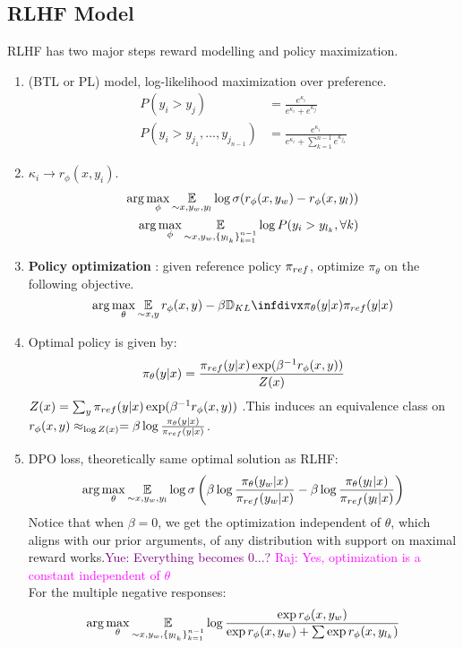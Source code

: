 \documentclass{article}
\newcommand{\yue}[1]{\textcolor{purple}{Yue: #1}}
\newcommand{\raj}[1]{\textcolor{magenta}{Raj: #1}}
\begin{document}
\subsection{RLHF Model}
RLHF has two major steps reward modelling and policy maximization.
\begin{enumerate}
    \item (BTL or PL) model, log-likelihood maximization over preference.
    \begin{align}
        P(y_i>y_j)&=\frac{e^{\kappa_i}}{e^{\kappa_i}+e^{\kappa_j}}\\
        P(y_i>y_{j_1},\dots,y_{j_{n-1}})&=\frac{e^{\kappa_i}}{e^{\kappa_i}+\sum_{k=1}^{n-1}e^{\kappa_{j_k}}}
    \end{align}
    \item $\kappa_i\to r_\phi(x,y_i)$.
    \begin{align}
    \arg\max\limits_{\phi}\operatorname*{\mathbb{E}}\limits_{\sim x, y_w, y_l}\log\sigma(r_\phi(x,y_w)-r_\phi(x,y_l))\\
    \arg\max\limits_{\phi}\operatorname*{\mathbb{E}}\limits_{\sim x, y_w, \{y_{l_k}\}_{k=1}^{n-1}}\log P(y_i>y_{l_k},\forall k)
    \end{align}
    \item \textbf{Policy optimization} : given reference policy $\pi_{ref}$, optimize $\pi_{\theta}$ on the following objective.
    \begin{equation}
        \arg\max\limits_{\theta}\E\limits_{\sim x,y} r_\phi(x,y) -\beta\infdiv{\pi_\theta (y|x)}{\pref(y|x)}
    \end{equation}
    \item Optimal policy is given by:
    \begin{equation}
\pi_\theta(y|x)=\frac{\pi_{ref}(y|x)\exp(\beta^{-1}r_\phi(x,y))}{Z(x)}
    \end{equation}
    $Z(x)=\sum_y\pi_{ref}(y|x)\exp(\beta^{-1}r_\phi(x,y))$
    .This induces an equivalence class on $r_\phi(x,y)\approx_{\log Z(x)}=\beta\log\frac{\pi_\theta(y|x)}{\pi_{ref}(y|x)}$.
    \item DPO loss, theoretically same optimal solution as RLHF:
    \begin{align}
         \arg\max\limits_{\theta}\operatorname*{\mathbb{E}}\limits_{\sim x, y_w, y_l}\log\sigma\left(\beta\log\frac{\pi_\theta(y_w|x)}{\pi_{ref}(y_w|x)}-\beta\log\frac{\pi_\theta(y_l|x)}{\pi_{ref}(y_l|x)}\right)
    \end{align}
    Notice that when $\beta=0$, we get the optimization independent of $\theta$, which aligns with our prior arguments, of any distribution with support on maximal reward works.\yue{Everything becomes 0...?} \raj{Yes, optimization is a constant independent of $\theta$} \\
    For the multiple negative responses:
    \begin{equation}
\arg\max\limits_{\theta}\operatorname*{\mathbb{E}}\limits_{\sim x, y_w, \{y_{l_k}\}_{k=1}^{n-1}}\log \frac{\exp r_\phi(x,y_w)}{\exp r_\phi(x,y_w)+\sum\exp r_\phi(x,y_{l_k})}
    \end{equation}
\end{enumerate}
\end{document}
